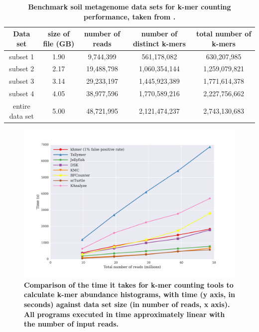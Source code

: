 \begin{table}[!ht]
\caption{
\bf{Benchmark soil metagenome data sets for k-mer counting performance, taken from
\cite{Howe2012}.}}
\begin{tabular}{ |c | c |c| c|c| }
\hline
Data set & size of file (GB) & number of reads & number of distinct
k-mers & total number of k-mers \\
\hline
subset 1        & 1.90 &  9,744,399 &   561,178,082 &   630,207,985 \\
subset 2        & 2.17 & 19,488,798 & 1,060,354,144 & 1,259,079,821 \\
subset 3        & 3.14 & 29,233,197 & 1,445,923,389 & 1,771,614,378 \\
subset 4        & 4.05 & 38,977,596 & 1,770,589,216 & 2,227,756,662 \\
entire data set & 5.00 & 48,721,995 & 2,121,474,237 & 2,743,130,683 \\
\end{tabular}
\begin{flushleft}
\end{flushleft}
\label{table:datasets}
\end{table}


\begin{figure}[!ht]
\centerline{\includegraphics[width=5in]{./figures/figure1_time_benchmark}}

\caption{\bf Comparison of the time it takes for k-mer counting tools
  to calculate k-mer abundance histograms, with time (y axis, in
  seconds) against data set size (in number of reads, x axis).  
  All programs executed in time approximately linear with
  the number of input reads.}

\label{fig:cmp_time}
\end{figure}

